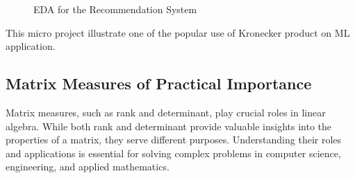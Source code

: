 \documentclass[
  letterpaper,
  DIV=11,
  numbers=noendperiod]{scrreprt}
\theoremstyle{plain}
\theoremstyle{definition}
\theoremstyle{remark}
\begin{document}
\begin{figure}[H]


\caption{\label{fig-reco}EDA for the Recommendation System}

\end{figure}%

This micro project illustrate one of the popular use of Kronecker
product on ML application.

\subsection*{Matrix Measures of Practical
Importance}\label{matrix-measures-of-practical-importance}

Matrix measures, such as rank and determinant, play crucial roles in
linear algebra. While both rank and determinant provide valuable
insights into the properties of a matrix, they serve different purposes.
Understanding their roles and applications is essential for solving
complex problems in computer science, engineering, and applied
mathematics.
\end{document}
